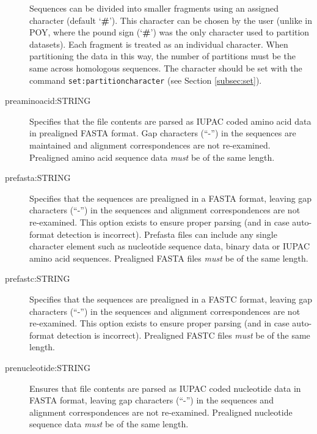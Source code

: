 \begin{description}
		\begin{tcolorbox}[enhanced,fit to height=3.5cm,
  		colback=JungleGreen!40!black!2!white,colframe=JungleGreen!70!black,title=Note,
  		drop fuzzy shadow]
  		Sequences can be divided into smaller fragments using an assigned character (default 
		`\textbf{\#}'). This character can be chosen by the user (unlike in POY, where the pound sign 
		(`\textbf{\#}') was the only character used to partition datasets). Each fragment is treated as 
		an individual character. When partitioning the data in this way, the number of partitions must 
		be the same across homologous sequences. The character should be set with the command 
		\texttt{set:partitioncharacter} (see Section \ref{subsec:set}).
		\end{tcolorbox}
			
		\item [preaminoacid:STRING] Specifies that the file contents are parsed as IUPAC coded 
		amino acid data in prealigned FASTA \citep{PearsonandLipman1988} format. Gap characters 
		(``-'') in the sequences are maintained and alignment correspondences are not re-examined.
		Prealigned amino acid sequence data \textit{must} be of the same length.
	
		\item [prefasta:STRING] Specifies that the sequences are prealigned in a FASTA format, 
		leaving gap characters (``-'') in the sequences and alignment correspondences are not 
		re-examined. This option exists to ensure proper parsing (and in case auto-format detection 
		is incorrect). Prefasta files can include any single character element such as nucleotide 
		sequence data, binary data or IUPAC amino acid sequences. Prealigned FASTA files 
		\textit{must} be of the same length. 
			
		\item [prefastc:STRING] Specifies that the sequences are prealigned in a FASTC format, 
		leaving gap characters (``-'') in the sequences and alignment correspondences are not 
		re-examined. This option exists to ensure proper parsing (and in case auto-format detection 
		is incorrect). Prealigned FASTC files \textit{must} be of the same length.
		
		
		\item [prenucleotide:STRING] Ensures that file contents are parsed as IUPAC coded 
		nucleotide data in FASTA \citep{PearsonandLipman1988} format, leaving gap characters 
		(``-'') in the sequences and alignment correspondences are not re-examined. Prealigned 
		nucleotide sequence data \textit{must} be of the same length.
		

\end{description}
